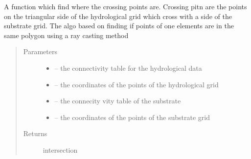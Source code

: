 \documentclass[letterpaper,10pt,english]{sphinxmanual}
\begin{document}
\begin{fulllineitems}
\label{\detokenize{index:src.substrate.point_cross2}}
A function which find where the crossing points are. Crossing pitn are the points on the triangular side of the
hydrological grid which cross with a side of the substrate grid. The algo based on finding if points of one elements
are in the same polygon using a ray casting method
\begin{quote}\begin{description}
\item[{Parameters}] \leavevmode\begin{itemize}
\item {} 
 -- the connectivity table for the hydrological data

\item {} 
 -- the coordinates of the points of the hydrological grid

\item {} 
 -- the connecity vity table of the substrate

\item {} 
 -- the coordinates of the points of the substrate grid

\end{itemize}

\item[{Returns}] \leavevmode
intersection

\end{description}\end{quote}

\end{fulllineitems}

\end{document}
